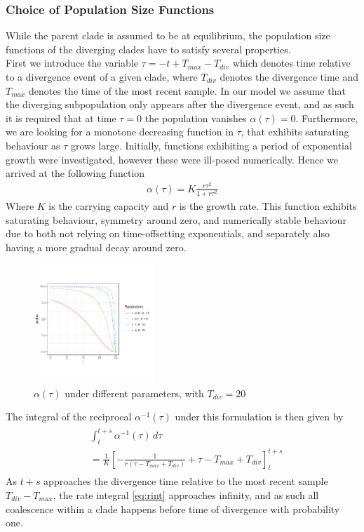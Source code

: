 \documentclass{ieeeaccess}
\theoremstyle{definition}
\begin{document}
\subsubsection{Choice of Population Size Functions} 
While the parent clade is assumed to be at equilibrium, the population size functions of the diverging clades have to satisfy several properties.\\
First we introduce the variable $\tau = -t + T_{max} - T_{div}$ which denotes time relative to a divergence event of a given clade, where $T_{div}$ denotes the divergence time and $T_{max}$ denotes the time of the most recent sample.
In our model we assume that the diverging subpopulation only appears after the divergence event, and as such it is required that at time $\tau=0$ the population vanishes $\alpha(\tau)=0$. Furthermore, we are looking for a monotone decreasing function in $\tau$, that exhibits saturating behaviour as $\tau$ grows large.
Initially, functions exhibiting a period of exponential growth were investigated, however these were ill-posed numerically.
Hence we arrived at the following function
\begin{gather}
\alpha(\tau) = K\frac{r\tau^2}{1+r\tau^2}
\end{gather} 
Where $K$ is the carrying capacity and $r$ is the growth rate.
This function  exhibits saturating behaviour, symmetry around zero, and numerically stable behaviour due to both not relying on time-offsetting exponentials, and separately also having a more gradual decay around zero.\\
\begin{figure}[H]
  \centering
     \includegraphics[width=0.4\textwidth]{../R/alpha_plots}
    \caption{$\alpha(\tau)$ under different parameters, with $T_{div}=20$}
\end{figure}
The integral of the reciprocal $\alpha^{-1}(\tau)$ under this formulation is then given by 
\begin{gather}
\begin{aligned}\label{eq:rint}
&\int_{t}^{t+s}\alpha^{-1}(\tau)\,d\tau\\ &= \frac{1}{K}\left[-\frac{1}{r(\tau-T_{max}+T_{div})}+\tau-T_{max}+T_{div}\right]_{t}^{t+s}
\end{aligned}
\end{gather}
As $t+s$ approaches the divergence time relative to the most recent sample $T_{div} - T_{max}$, the rate integral \ref{eq:rint} approaches infinity, and as such all coalescence within a clade happens before time of divergence with probability one.
\end{document}
